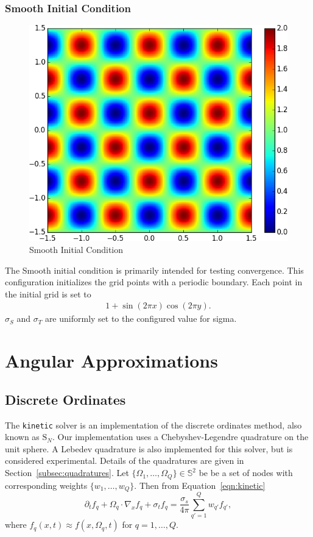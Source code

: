 \documentclass{article}
\newcommand{\twosphere}{\ensuremath{\mathbb{S}^2}\xspace}
\newcommand{\kinetic}{\texttt{kinetic}\xspace}
\begin{document}
\subsubsection{Smooth Initial Condition}
\begin{figure}
    \centering
    \includegraphics[height=0.3\textheight]{initcond_smooth.png}
    \caption{Smooth Initial Condition}
    \label{fig:smooth_ic}
\end{figure}
The Smooth initial condition is primarily intended for testing convergence.
This configuration initializes the grid points with a periodic boundary.
Each point in the initial grid is set to
\begin{align}
1 + \sin(2\pi x)\cos(2\pi y).
\end{align}
$\sigma_S$ and $\sigma_T$ are uniformly set to the configured
value for sigma.


\section{Angular Approximations}
\subsection{Discrete Ordinates}
The \kinetic solver is an implementation of the discrete ordinates method, also known
as $\mathrm{S}_N$.
Our implementation uses a Chebyshev-Legendre quadrature on the unit sphere.
A Lebedev quadrature is also implemented for this solver,
but is considered experimental.
Details of the quadratures are given in Section~\ref{subsec:quadratures}. Let
$\{\Omega_1, \dots, \Omega_Q\} \in \twosphere$ be be a set of nodes with
corresponding weights $\{w_1, \dots, w_Q\}$. Then from Equation~\ref{eqn:kinetic}
\begin{equation}
    \partial_t f_q + \Omega_q \cdot \nabla_x f_q + \sigma_t f_q=
    \frac{\sigma_s}{4\pi} \sum_{q'=1}^Q w_{q'} f_{q'},
\end{equation}
where $f_q(x,t) \approx f(x, \Omega_q, t)$ for $q = 1, \dots, Q$.
\end{document}

